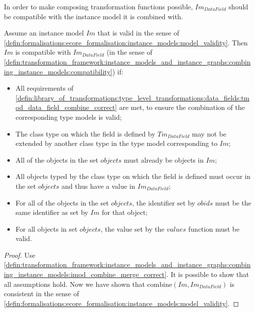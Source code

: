 In order to make composing transformation functions possible, $Im_{DataField}$ should be compatible with the instance model it is combined with.

\begin{thm}
\label{defin:library_of_transformations:instance_level_transformations:data_field_values:imod_data_field_combine_correct}
Assume an instance model $Im$ that is valid in the sense of \cref{defin:formalisations:ecore_formalisation:instance_models:model_validity}. Then $Im$ is compatible with $Im_{DataField}$ (in the sense of \cref{defin:transformation_framework:instance_models_and_instance_graphs:combining_instance_models:compatibility}) if:
\begin{itemize}
    \item All requirements of \cref{defin:library_of_transformations:type_level_transformations:data_fields:tmod_data_field_combine_correct} are met, to ensure the combination of the corresponding type models is valid;
    \item The class type on which the field is defined by $Tm_{DataField}$ may not be extended by another class type in the type model corresponding to $Im$;
    \item All of the objects in the set $objects$ must already be objects in $Im$;
    \item All objects typed by the class type on which the field is defined must occur in the set $objects$ and thus have a value in $Im_{DataField}$;
    \item For all of the objects in the set $objects$, the identifier set by $obids$ must be the same identifier as set by $Im$ for that object;
    \item For all objects in set $objects$, the value set by the $values$ function must be valid.
\end{itemize}
\end{thm}

\begin{proof}
Use \cref{defin:transformation_framework:instance_models_and_instance_graphs:combining_instance_models:imod_combine_merge_correct}. It is possible to show that all assumptions hold. Now we have shown that $\mathrm{combine}(Im, Im_{DataField})$ is consistent in the sense of \cref{defin:formalisations:ecore_formalisation:instance_models:model_validity}.
\end{proof}


